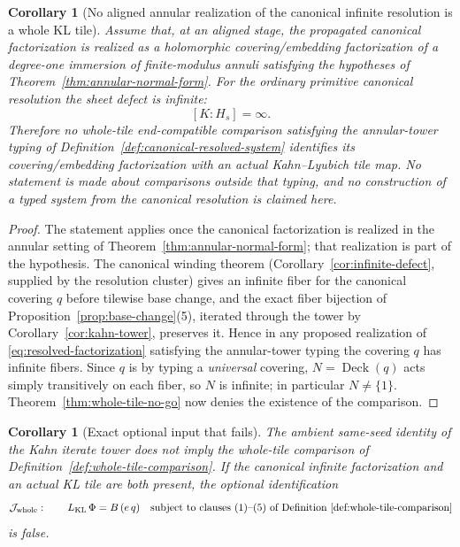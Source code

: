 \documentclass[11pt,reqno]{amsart}
\newtheorem{corollary}[theorem]{Corollary}
\theoremstyle{definition}
\theoremstyle{remark}
\begin{document}
\begin{corollary}[No aligned annular realization of the canonical infinite resolution is a whole KL tile]\label{cor:canonical-not-whole-tile}
Assume that, at an aligned stage, the propagated canonical factorization is realized as a holomorphic covering/embedding factorization of a degree-one immersion of finite-modulus annuli satisfying the hypotheses of Theorem~\ref{thm:annular-normal-form}.  For the ordinary primitive canonical resolution the sheet defect is infinite:
\[
[K:H_s]=\infty.
\]
Therefore no whole-tile end-compatible comparison satisfying the annular-tower typing of Definition~\ref{def:canonical-resolved-system} identifies its covering/embedding factorization with an actual Kahn--Lyubich tile map.  No statement is made about comparisons outside that typing, and no construction of a typed system from the canonical resolution is claimed here.
\end{corollary}

\begin{proof}
The statement applies once the canonical factorization is realized in the annular setting of Theorem~\ref{thm:annular-normal-form}; that realization is part of the hypothesis.  The canonical winding theorem (Corollary~\ref{cor:infinite-defect}, supplied by the resolution cluster) gives an infinite fiber for the canonical covering \(q\) before tilewise base change, and the exact fiber bijection of Proposition~\ref{prop:base-change}(5), iterated through the tower by Corollary~\ref{cor:kahn-tower}, preserves it.  Hence in any proposed realization of \eqref{eq:resolved-factorization} satisfying the annular-tower typing the covering \(q\) has infinite fibers.  Since \(q\) is by typing a \emph{universal} covering, \(N=\operatorname{Deck}(q)\) acts simply transitively on each fiber, so \(N\) is infinite; in particular \(N\ne\{1\}\).  Theorem~\ref{thm:whole-tile-no-go} now denies the existence of the comparison.
\end{proof}
\begin{corollary}[Exact optional input that fails]\label{cor:optional-input-fails}
The ambient same-seed identity of the Kahn iterate tower does not imply the whole-tile comparison of Definition~\ref{def:whole-tile-comparison}.  If the canonical infinite factorization and an actual KL tile are both present, the optional identification
\begin{equation}\label{eq:optional-identification}
\mathcal J_{\mathrm{whole}}:\qquad L_{\mathrm{KL}}\,\Phi=B\,(e\,q)\quad\text{subject to clauses (1)--(5) of Definition~\ref{def:whole-tile-comparison}}
\end{equation}
is false.
\end{corollary}
\end{document}

